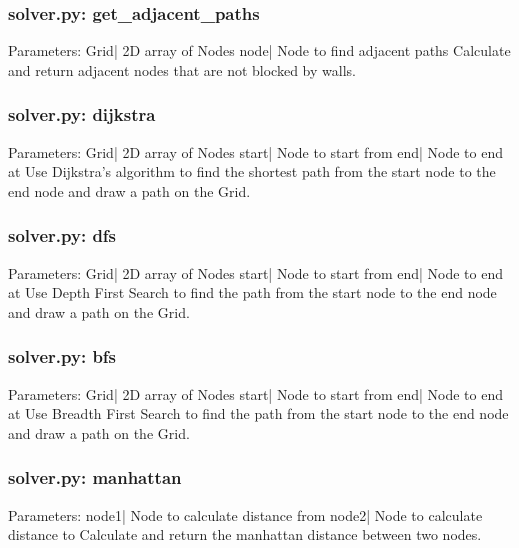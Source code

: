 \documentclass[titlepage]{article}
\begin{document}
\subsubsection{solver.py: get\_adjacent\_paths}
Parameters:\newline
\indent Grid| 2D array of Nodes\newline
\indent node| Node to find adjacent paths\newline
Calculate and return adjacent nodes that are not blocked by walls.

\subsubsection{solver.py: dijkstra}
Parameters:\newline
\indent Grid| 2D array of Nodes\newline
\indent start| Node to start from\newline
\indent end| Node to end at\newline
Use Dijkstra's algorithm to find the shortest path from the start node to the end node and draw a path on the Grid.

\subsubsection{solver.py: dfs}
Parameters:\newline
\indent Grid| 2D array of Nodes\newline
\indent start| Node to start from\newline
\indent end| Node to end at\newline
Use Depth First Search to find the path from the start node to the end node and draw a path on the Grid.

\subsubsection{solver.py: bfs}
Parameters:\newline
\indent Grid| 2D array of Nodes\newline
\indent start| Node to start from\newline
\indent end| Node to end at\newline
Use Breadth First Search to find the path from the start node to the end node and draw a path on the Grid.

\subsubsection{solver.py: manhattan}
Parameters:\newline
\indent node1| Node to calculate distance from\newline
\indent node2| Node to calculate distance to\newline
Calculate and return the manhattan distance between two nodes.
\end{document}
